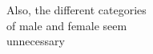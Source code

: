 \documentclass[preview]{standalone}
\begin{document}
\begin{center}
Also, the different categories\\of male and female seem\\unnecessary
\end{center}
\end{document}
